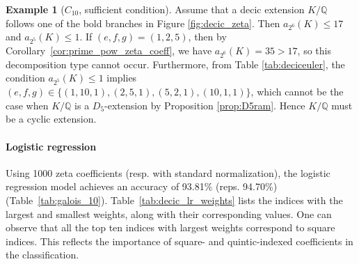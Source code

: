\documentclass[letterpaper, 10pt]{article}
\newcommand{\bQ}{\mathbb{Q}}
\newcommand{\1}{\mathds{1}}	%
\theoremstyle{definition}
\newtheorem{example}[theorem]{Example}
\theoremstyle{remark}
\begin{document}
\begin{example}[$C_{10}$, sufficient condition]
\label{ex:decic_zeta_branch}
    Assume that a decic extension $K / \bQ$ follows one of the bold branches in Figure \ref{fig:decic_zeta}.
    Then $a_{2^6}(K) \le 17$ and $a_{2^5}(K) \le  1$. If \( (e, f, g) = (1, 2, 5) \), then by Corollary~\ref{cor:prime_pow_zeta_coeff}, we have \( a_{2^6}(K) = 35 > 17 \), so this decomposition type cannot occur.  Furthermore, from Table \ref{tab:deciceuler}, the condition $a_{2^5}(K) \le 1$ implies $(e, f, g) \in \{(1, 10, 1), (2, 5, 1), (5, 2, 1), (10, 1, 1)\}$, which cannot be the case when $K / \bQ$ is a $D_{5}$-extension by Proposition \ref{prop:D5ram}.
    Hence $K / \bQ$ must be a cyclic extension.
\end{example}


\paragraph{Logistic regression}

Using 1000 zeta coefficients (resp. with standard normalization), the logistic regression model achieves an accuracy of 93.81\% (reps. 94.70\%)  (Table~\ref{tab:galois_10}).  
Table~\ref{tab:decic_lr_weights} lists the indices with the largest and smallest weights, along with their corresponding values.  
One can observe that all the top ten indices with largest weights correspond to square indices.
This reflects the importance of square- and quintic-indexed coefficients in the classification.

\begin{table}[H]
    \begin{center}
        \caption{Indices of the 10 largest and smallest weights (with actual weight values in parentheses) among 1000 logistic regression coefficients used to classify Galois groups of decic fields  with normalized zeta coefficients. The bold numbers correspond to indices that are squares.}
        \label{tab:decic_lr_weights}
    \end{center}
\end{table}
\end{document}

